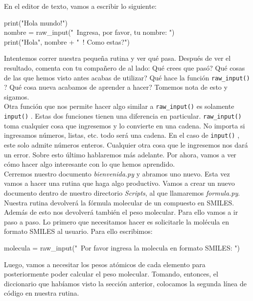 \documentclass[10pt,letterpaper]{article}
\newcommand{\inlinecode}[1]{
\colorbox{light-gray}{\texttt{#1}}
}
\newenvironment{Code}
{
\begin{lrbox}{\selvestebox}%
\begin{minipage}{\dimexpr\columnwidth-2\fboxsep\relax}
\fontfamily{\ttdefault}\selectfont
}
{\end{minipage}\end{lrbox}%
\begin{center}
\colorbox{light-gray}{\usebox{\selvestebox}}
\end{center}
}
\begin{document}
\noindent En el editor de texto, vamos a escribir lo siguiente:

\begin{Code}
print("Hola mundo!")\\
nombre = raw\_input("\ \hspace{-2mm}Ingresa, por favor, tu nombre: ")\\
print("Hola", nombre + "\ \hspace{-2mm}! Como estas?")
\end{Code}

Intentemos correr nuestra peque\~na rutina y ver qu\'e pasa. Despu\'es de ver el resultado, comenta con tu compa\~nero de al lado: Qu\'e crees que pas\'o? Qu\'e cosas de las que hemos visto antes acabas de utilizar? Qu\'e hace la funci\'on \inlinecode{raw\_input()}? Qu\'e cosa nueva acabamos de aprender a hacer? Tomemos nota de esto y sigamos.\\

Otra funci\'on que nos permite hacer algo similar a \inlinecode{raw\_input()} es solamente \inlinecode{input()}. Estas dos funciones tienen una diferencia en particular. \inlinecode{raw\_input()} toma cualquier cosa que ingresemos y lo convierte en una cadena. No importa si ingresamos n\'umeros, listas, etc. todo ser\'a una cadena. En el caso de \inlinecode{input()}, este solo admite n\'umeros enteros. Cualquier otra cosa que le ingresemos nos dar\'a un error. Sobre esto \'ultimo hablaremos m\'as adelante. Por ahora, vamos a ver c\'omo hacer algo interesante con lo que hemos aprendido.\\

Cerremos nuestro documento \textit{bienvenida.py} y abramos uno nuevo. Esta vez vamos a hacer una rutina que haga algo productivo. Vamos a crear un nuevo documento dentro de nuestro directorio \textit{Scripts}, al que llamaremos \textit{formula.py}. Nuestra rutina devolver\'a la f\'ormula molecular de un compuesto en SMILES. Adem\'as de esto nos devolver\'a tambi\'en el peso molecular. Para ello vamos a ir paso a paso. Lo primero que necesitamos hacer es solicitarle la mol\'ecula en formato SMILES al usuario. Para ello escribimos:

\begin{Code}
molecula = raw\_input("\ \hspace{-2mm}Por favor ingresa la molecula en formato SMILES: ")
\end{Code}

\noindent Luego, vamos a necesitar los pesos at\'omicos de cada elemento para posteriormente poder calcular el peso molecular. Tomando, entonces, el diccionario que hab\'iamos visto la secci\'on anterior, colocamos la segunda l\'inea de c\'odigo en nuestra rutina.
\end{document}
